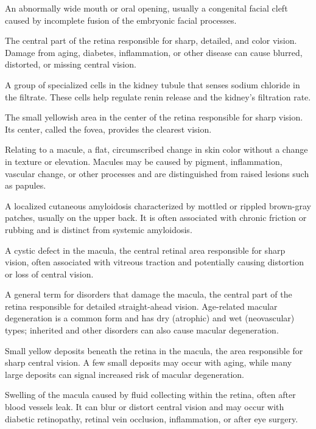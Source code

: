  An abnormally wide mouth or oral opening, usually a congenital facial cleft caused by incomplete fusion of the embryonic facial processes.

 The central part of the retina responsible for sharp, detailed, and color vision. Damage from aging, diabetes, inflammation, or other disease can cause blurred, distorted, or missing central vision.

 A group of specialized cells in the kidney tubule that senses sodium chloride in the filtrate. These cells help regulate renin release and the kidney's filtration rate.

 The small yellowish area in the center of the retina responsible for sharp vision. Its center, called the fovea, provides the clearest vision.

 Relating to a macule, a flat, circumscribed change in skin color without a change in texture or elevation.
Macules may be caused by pigment, inflammation, vascular change, or other processes and are
distinguished from raised lesions such as papules.

 A localized cutaneous amyloidosis characterized by mottled or rippled brown-gray patches, usually on the upper back. It is often associated with chronic friction or rubbing and is distinct from systemic amyloidosis.

 A cystic defect in the macula, the central retinal area responsible for sharp vision, often associated with vitreous traction and potentially causing distortion or loss of central vision.

 A general term for disorders that damage the macula, the central part of the retina responsible for detailed straight-ahead vision. Age-related macular degeneration is a common form and has dry (atrophic) and wet (neovascular) types; inherited and other disorders can also cause macular degeneration.

 Small yellow deposits beneath the retina in the macula, the area responsible for sharp central vision. A few small deposits may occur with aging, while many large deposits can signal increased risk of macular degeneration.

 Swelling of the macula caused by fluid collecting within the retina, often after blood vessels leak. It can blur or distort central vision and may occur with diabetic retinopathy, retinal vein occlusion, inflammation, or after eye surgery.

